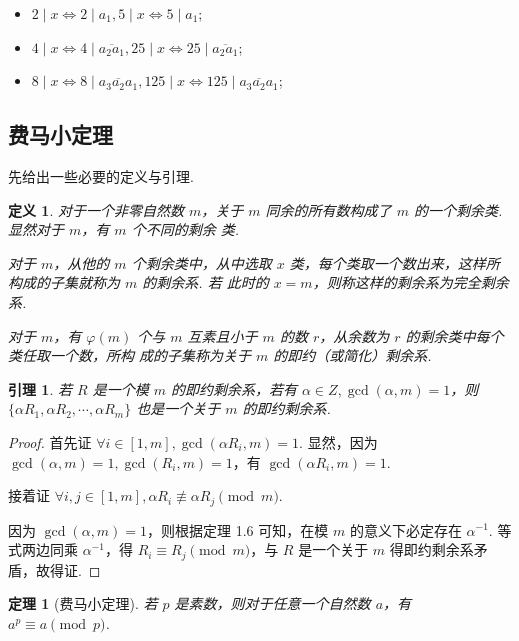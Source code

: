 \documentclass[a4paper]{article}
\newtheorem{theorem}{定理}[section]
\newtheorem{lemma}{引理}[section]
\newtheorem{definition}{定义}[section]
\begin{document}
\begin{itemize}
    \item $2\mid x\Leftrightarrow 2\mid a_1,5\mid x\Leftrightarrow 5\mid a_1$;
    \item $4\mid x\Leftrightarrow 4\mid \overline{a_2a_1},25\mid x\Leftrightarrow 25 \mid \overline{
                  a_2a_1}$;
    \item $8\mid x\Leftrightarrow 8\mid \overline{a_3a_2a_1},125\mid x\Leftrightarrow 125\mid
              \overline{a_3a_2a_1}$;
\end{itemize}

\subsection{费马小定理}

先给出一些必要的定义与引理.

\begin{definition}
    对于一个非零自然数 $m$，关于 $m$ 同余的所有数构成了 $m$ 的一个剩余类. 显然对于 $m$，有 $m$ 个不同的剩余
    类.

    对于 $m$，从他的 $m$ 个剩余类中，从中选取 $x$ 类，每个类取一个数出来，这样所构成的子集就称为 $m$ 的剩余系. 若
    此时的 $x=m$，则称这样的剩余系为完全剩余系.

    对于 $m$，有 $\varphi(m)$ 个与 $m$ 互素且小于 $m$ 的数 $r$，从余数为 $r$ 的剩余类中每个类任取一个数，所构
    成的子集称为关于 $m$ 的即约（或简化）剩余系.
\end{definition}

\begin{lemma}
    若 $R$ 是一个模 $m$ 的即约剩余系，若有 $\alpha\in Z,\gcd(\alpha,m)=1$，则 $\{\alpha R_1,\alpha R_2,
        \cdots, \alpha R_m\}$ 也是一个关于 $m$ 的即约剩余系.
\end{lemma}

\begin{proof}
    首先证 $\forall i \in [1,m],\gcd(\alpha R_i,m)=1$. 显然，因为 $\gcd(\alpha,m)=1,\gcd(R_i,m)=1$，有 $\gcd
        (\alpha R_i,m)=1$.

    接着证 $\forall i,j\in [1,m],\alpha R_i \not\equiv \alpha R_j \pmod m$.

    因为 $\gcd(\alpha,m)=1$，则根据定理 1.6 可知，在模 $m$ 的意义下必定存在 $\alpha^{-1}$. 等式两边同乘 $\alpha
        ^{-1}$，得 $R_i\equiv R_j\pmod m$，与 $R$ 是一个关于 $m$ 得即约剩余系矛盾，故得证.
\end{proof}

\begin{theorem}[费马小定理]
    若 $p$ 是素数，则对于任意一个自然数 $a$，有 $a^p\equiv a\pmod p$.
\end{theorem}
\end{document}
